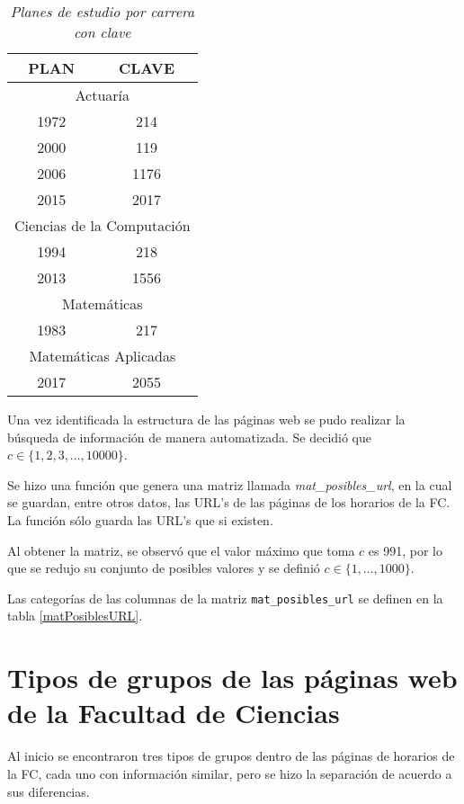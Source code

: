 \begin{table}[h]
\centering
\begin{tabular}{|c|c|}
 \hline 
  PLAN & CLAVE \\ 
 \hline 
 \multicolumn{2}{|c|}{Actuaría} \\ 
 \hline 
 1972 & 214 \\ 
 \hline 
 2000 & 119 \\ 
 \hline 
 2006 & 1176 \\ 
 \hline 
 2015 & 2017 \\ 
 \hline 
 \multicolumn{2}{|c|}{Ciencias de la Computación} \\ 
 \hline 
 1994 & 218 \\ 
 \hline 
 2013 & 1556 \\ 
 \hline 
 \multicolumn{2}{|c|}{Matemáticas} \\ 
 \hline 
 1983 & 217 \\ 
 \hline 
 \multicolumn{2}{|c|}{Matemáticas Aplicadas} \\ 
 \hline 
 2017 & 2055 \\ 
 \hline 
 \end{tabular}
\caption{\textit{Planes de estudio por carrera con clave}}\label{PlanesEstudio}
\end{table}

Una vez identificada la estructura de las páginas web se pudo realizar la búsqueda de información de manera automatizada. Se decidió que $c \in \{1,2,3, \ldots, 10 000\}$.

Se hizo una función que genera una matriz llamada \textit{mat\_posibles\_url}, en la cual se guardan, entre otros datos, las URL's de las páginas de los horarios de la FC. La función sólo guarda las URL's que si existen.

Al obtener la matriz, se observó que el valor máximo que toma $c$ es 991, por lo que se redujo su conjunto de posibles valores y se definió $c \in \{1, \ldots, 1 000\}$.

Las categorías de las columnas de la matriz \verb+mat_posibles_url+ se definen en la tabla \ref{matPosiblesURL}.

\dfNmatrizChica %


\section{Tipos de grupos de las páginas web de la Facultad de Ciencias} \label{TiposDeGpos}

Al inicio se encontraron tres tipos de grupos dentro de las páginas de horarios de la FC, cada uno con información similar, pero se hizo la separación de acuerdo a sus diferencias.

